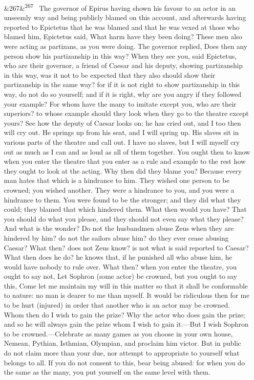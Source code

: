 \documentclass[12pt]{article}
\newcommand{\para}[1][]{\par\noindent\ifx&#1&\else\textsuperscript{\footnotesize #1}~\fi}
\begin{document}
\para[267] The governor of Epirus having shown his favour to an actor in an unseemly way and being publicly blamed on this account, and afterwards having reported to Epictetus that he was blamed and that he was vexed at those who blamed him, Epictetus said, What harm have they been doing? These men also were acting as partizans, as you were doing. The governor replied, Does then any person show his partizanship in this way? When they see you, said Epictetus, who are their governor, a friend of Caesar and his deputy, showing partizanship in this way, was it not to be expected that they also should show their partizanship in the same way? for if it is not right to show partizanship in this way, do not do so yourself; and if it is right, why are you angry if they followed your example? For whom have the many to imitate except you, who are their superiors? to whose example should they look when they go to the theatre except yours? See how the deputy of Caesar looks on: he has cried out, and I too then will cry out. He springs up from his seat, and I will spring up. His slaves sit in various parts of the theatre and call out. I have no slaves, but I will myself cry out as much as I can and as loud as all of them together. You ought then to know when you enter the theatre that you enter as a rule and example to the rest how they ought to look at the acting. Why then did they blame you? Because every man hates that which is a hindrance to him. They wished one person to be crowned; you wished another. They were a hindrance to you, and you were a hindrance to them. You were found to be the stronger; and they did what they could; they blamed that which hindered them. What then would you have? That you should do what you please, and they should not even say what they please? And what is the wonder? Do not the husbandmen abuse Zeus when they are hindered by him? do not the sailors abuse him? do they ever cease abusing Caesar? What then? does not Zeus know? is not what is said reported to Caesar? What then does he do? he knows that, if he punished all who abuse him, he would have nobody to rule over. What then? when you enter the theatre, you ought to say not, Let Sophron (some actor) be crowned, but you ought to say this, Come let me maintain my will in this matter so that it shall be conformable to nature: no man is dearer to me than myself. It would be ridiculous then for me to be hurt (injured) in order that another who is an actor may be crowned. Whom then do I wish to gain the prize? Why the actor who does gain the prize; and so he will always gain the prize whom I wish to gain it.—But I wish Sophron to be crowned.—Celebrate as many games as you choose in your own house, Nemean, Pythian, Isthmian, Olympian, and proclaim him victor. But in public do not claim more than your due, nor attempt to appropriate to yourself what belongs to all. If you do not consent to this, bear being abused: for when you do the same as the many, you put yourself on the same level with them.
\end{document}
